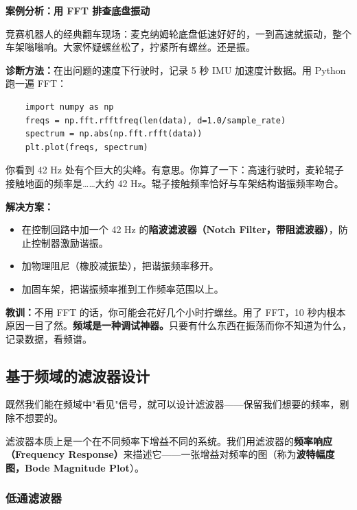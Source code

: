 \vspace{0.5em}
\begin{mdframed}[linewidth=1pt, innertopmargin=10pt, innerbottommargin=10pt]
\textbf{案例分析：用 FFT 排查底盘振动}

\vspace{0.3em}
竞赛机器人的经典翻车现场：麦克纳姆轮底盘低速好好的，一到高速就振动，整个车架嗡嗡响。大家怀疑螺丝松了，拧紧所有螺丝。还是振。

\textbf{诊断方法：}在出问题的速度下行驶时，记录 5 秒 IMU 加速度计数据。用 Python 跑一遍 FFT：

\begin{verbatim}
    import numpy as np
    freqs = np.fft.rfftfreq(len(data), d=1.0/sample_rate)
    spectrum = np.abs(np.fft.rfft(data))
    plt.plot(freqs, spectrum)
\end{verbatim}

你看到 42 Hz 处有个巨大的尖峰。有意思。你算了一下：高速行驶时，麦轮辊子接触地面的频率是……大约 42 Hz。辊子接触频率恰好与车架结构谐振频率吻合。

\textbf{解决方案：}
\begin{itemize}[nosep]
    \item 在控制回路中加一个 42 Hz 的\textbf{陷波滤波器（Notch Filter，带阻滤波器）}，防止控制器激励谐振。
    \item 加物理阻尼（橡胶减振垫），把谐振频率移开。
    \item 加固车架，把谐振频率推到工作频率范围以上。
\end{itemize}

\textbf{教训：}不用 FFT 的话，你可能会花好几个小时拧螺丝。用了 FFT，10 秒内根本原因一目了然。\textbf{频域是一种调试神器。}只要有什么东西在振荡而你不知道为什么，记录数据，看频谱。
\end{mdframed}

\subsection{基于频域的滤波器设计}

既然我们能在频域中"看见"信号，就可以设计滤波器——保留我们想要的频率，剔除不想要的。

滤波器本质上是一个在不同频率下增益不同的系统。我们用滤波器的\textbf{频率响应（Frequency Response）}来描述它——一张增益对频率的图（称为\textbf{波特幅度图，Bode Magnitude Plot}）。

\subsubsection{低通滤波器}

